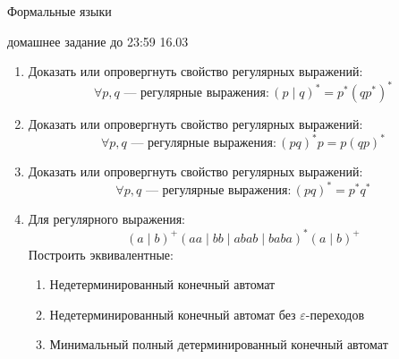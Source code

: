 \documentclass[12pt]{article}
\begin{document}
\begin{center} {\LARGE Формальные языки} \end{center}

\begin{center} \Large домашнее задание до 23:59 16.03 \end{center}
\bigskip

\begin{enumerate}
  \item Доказать или опровергнуть свойство регулярных выражений:
  \[
    \forall p, q \text{ --- регулярные выражения}: (p \mid q)^* = p^*(qp^*)^*
  \]
  \item Доказать или опровергнуть свойство регулярных выражений:
  \[
    \forall p, q \text{ --- регулярные выражения}: (p q)^* p = p (q p)^*
  \]
  \item Доказать или опровергнуть свойство регулярных выражений:
  \[
    \forall p, q \text{ --- регулярные выражения}: (p q)^* = p^* q^*
  \]
  \item Для регулярного выражения:
   \[ (a \mid b)^+ (aa \mid bb \mid abab \mid baba)^* (a \mid b)^+\]
  Построить эквивалентные:
  \begin{enumerate}
    \item Недетерминированный конечный автомат
    \item Недетерминированный конечный автомат без $\varepsilon$-переходов
    \item Минимальный полный детерминированный конечный автомат
  \end{enumerate}

\end{enumerate}
\end{document}
